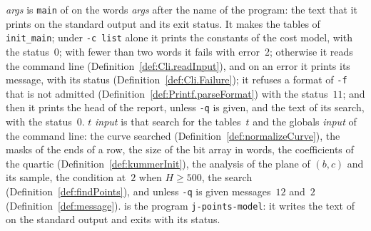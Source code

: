 \begin{definition}\label{def:Program.run}
  \leanok
   \textit{args} is \texttt{main} of \jpoints{} on the words
  \textit{args} after the name of the program: the text that it prints on the standard output and
  its exit status. It makes the tables of \texttt{init\_main}; under \texttt{-c list} alone it
  prints the constants of the cost model, with the status~$0$; with fewer than two words it fails
  with error~2; otherwise it reads the command line (Definition~\ref{def:Cli.readInput}), and on an
  error it prints its message, with its status (Definition~\ref{def:Cli.Failure}); it refuses a
  format of \texttt{-f} that is not admitted (Definition~\ref{def:Printf.parseFormat}) with the
  status~$11$; and then it prints the head of the report, unless \texttt{-q} is given, and the text
  of its search, with the status~$0$.  $t$ \textit{input} is that
  search for the tables~$t$ and the globals \textit{input} of the command line: the curve searched
  (Definition~\ref{def:normalizeCurve}), the masks of the ends of a row, the size of the bit array
  in words, the coefficients of the quartic (Definition~\ref{def:kummerInit}), the analysis of the
  plane of $(b, c)$ and its sample, the condition at~$2$ when $H \ge 500$, the search
  (Definition~\ref{def:findPoints}), and unless \texttt{-q} is given messages~$12$ and~$2$
  (Definition~\ref{def:message}).  is the program
  \texttt{j-points-model}: it writes the text of  on the standard output
  and exits with its status.
\end{definition}


